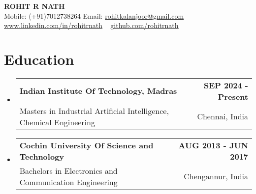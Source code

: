 \documentclass[letterpaper,11pt]{article}
\makeatletter
\newcommand{\resumeSubheading}[4]{
  \vspace{-2pt}\item
    \begin{tabular*}{1.0\textwidth}[t]{l@{\extracolsep{\fill}}r}
      \textbf{#1} & \textbf{\small #2} \\
      {\small#3} & {\small #4}
    \end{tabular*}\vspace{-7pt}
}
\newcommand{\resumeSubHeadingListStart}{\begin{itemize}[leftmargin=0.0in, label={}]}
\newcommand{\resumeSubHeadingListEnd}{\end{itemize}}
\makeatother
\begin{document}
\begin{center}
    {\Large  \scshape \textbf{ROHIT R NATH}} \\ \vspace{0.5pt}
    Mobile: (+91)7012738264
    Email: \underline{rohitkalanjoor@gmail.com} ~ 
    \href{https://www.linkedin.com/in/rohitrnath/}
     {\underline{www.linkedin.com/in/rohitrnath}}  ~
    \href{https://github.com/rohitrnath}{\underline{github.com/rohitrnath}}
    \vspace{-14pt}
\end{center}

 
 \vspace{-10pt}

\section{Education} 
  \resumeSubHeadingListStart
    \resumeSubheading
      {\textbf{Indian Institute Of Technology, Madras}}{SEP 2024 - Present}{Masters in Industrial Artificial Intelligence, Chemical Engineering}{Chennai, India}
    \vspace{-5pt}
    \resumeSubheading
      {Cochin University Of Science and Technology}{AUG 2013 - JUN 2017}
      {Bachelors in Electronics and Communication Engineering}{Chengannur, India}            
  \resumeSubHeadingListEnd  
 \vspace{-15pt}

\end{document}
